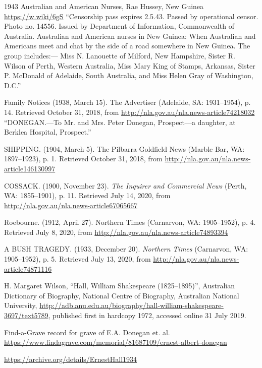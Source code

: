 \begin{thebibliography}{999}
    1943 Australian and American Nurses, Rae Hussey, New Guinea \url{https://w.wiki/6gS}
    ``Censorship pass expires 2.5.43. Passed by operational censor. Photo no. 14556.
    Issued by Department of Information, Commonwealth of Australia. Australian and American nurses in New Guinea:
    When Australian and Americans meet and chat by the side of a road somewhere in New Guinea. The group includes:---
    Miss N. Lanouette of Milford, New Hampshire, Sister R. Wilson of Perth, Western Australia,
    Miss Mary King of Stamps, Arkansas, Sister P. McDonald of Adelaide, South Australia,
    and Miss Helen Gray of Washington, D.C.''

    Family Notices (1938, March 15). The Advertiser (Adelaide, SA: 1931--1954), p. 14.
    Retrieved October 31, 2018, from \url{http://nla.gov.au/nla.news-article74218032}
    ``DONEGAN.---To Mr. and Mrs. Peter Donegan, Prospect---a daughter, at Berklea Hospital, Prospect.''

    SHIPPING. (1904, March 5). The Pilbarra Goldfield News (Marble Bar, WA: 1897--1923), p. 1.
    Retrieved October 31, 2018, from \url{http://nla.gov.au/nla.news-article146130997}

	COSSACK. (1900, November 23). \emph{The Inquirer and Commercial News} (Perth, WA: 1855--1901), p. 11.
	Retrieved July 14, 2020, from \url{http://nla.gov.au/nla.news-article67065667}

	Roebourne. (1912, April 27). Northern Times (Carnarvon, WA: 1905--1952), p. 4.
	Retrieved July 8, 2020, from \url{http://nla.gov.au/nla.news-article74893394}

	A BUSH TRAGEDY. (1933, December 20). \emph{Northern Times} (Carnarvon, WA: 1905--1952), p. 5.
	Retrieved July 13, 2020, from \url{http://nla.gov.au/nla.news-article74871116}

	H. Margaret Wilson, ``Hall, William Shakespeare (1825--1895)'',
	Australian Dictionary of Biography, National Centre of Biography, Australian National University,
	\url{http://adb.anu.edu.au/biography/hall-william-shakespeare-3697/text5789},
	published first in hardcopy 1972, accessed online 31 July 2019.

	Find-a-Grave record for grave of E.A. Donegan et. al.
	\url{https://www.findagrave.com/memorial/81687109/ernest-albert-donegan}

	\url{https://archive.org/details/ErnestHall1934}


\end{thebibliography}

